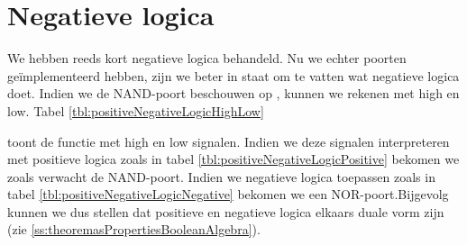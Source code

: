 \section{Negatieve logica}
\label{s:negativeLogic}
We hebben reeds kort negatieve logica behandeld. Nu we echter poorten ge\"implementeerd hebben, zijn we beter in staat om te vatten wat negatieve logica doet. Indien we de NAND-poort beschouwen op , kunnen we rekenen met high en low. Tabel \ref{tbl:positiveNegativeLogicHighLow}
\begin{table}[hbt]
\centering
{}
\caption{Verschil tussen positieve en negatieve logica.}
\label{tbl:positiveNegativeLogic}
\end{table}
toont de functie met high en low signalen. Indien we deze signalen interpreteren met positieve logica zoals in tabel \ref{tbl:positiveNegativeLogicPositive} bekomen we zoals verwacht de NAND-poort. Indien we negatieve logica toepassen zoals in tabel \ref{tbl:positiveNegativeLogicNegative} bekomen we een NOR-poort.Bijgevolg kunnen we dus stellen dat positieve en negatieve logica elkaars duale vorm zijn (zie \ref{ss:theoremasPropertiesBooleanAlgebra}).
